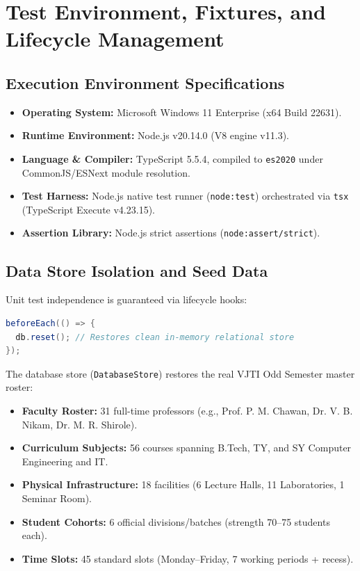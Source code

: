 \documentclass[11pt,a4paper]{article}
\begin{document}
\section{Test Environment, Fixtures, and Lifecycle Management}

\subsection{Execution Environment Specifications}
\begin{itemize}
    \item \textbf{Operating System:} Microsoft Windows 11 Enterprise (x64 Build 22631).
    \item \textbf{Runtime Environment:} Node.js v20.14.0 (V8 engine v11.3).
    \item \textbf{Language \& Compiler:} TypeScript 5.5.4, compiled to \texttt{es2020} under CommonJS/ESNext module resolution.
    \item \textbf{Test Harness:} Node.js native test runner (\texttt{node:test}) orchestrated via \texttt{tsx} (TypeScript Execute v4.23.15).
    \item \textbf{Assertion Library:} Node.js strict assertions (\texttt{node:assert/strict}).
\end{itemize}

\subsection{Data Store Isolation and Seed Data}
Unit test independence is guaranteed via lifecycle hooks:
\begin{lstlisting}[language=Java]
beforeEach(() => {
  db.reset(); // Restores clean in-memory relational store
});
\end{lstlisting}
The database store (\texttt{DatabaseStore}) restores the real VJTI Odd Semester master roster:
\begin{itemize}
    \item \textbf{Faculty Roster:} 31 full-time professors (e.g., Prof. P. M. Chawan, Dr. V. B. Nikam, Dr. M. R. Shirole).
    \item \textbf{Curriculum Subjects:} 56 courses spanning B.Tech, TY, and SY Computer Engineering and IT.
    \item \textbf{Physical Infrastructure:} 18 facilities (6 Lecture Halls, 11 Laboratories, 1 Seminar Room).
    \item \textbf{Student Cohorts:} 6 official divisions/batches (strength 70--75 students each).
    \item \textbf{Time Slots:} 45 standard slots (Monday--Friday, 7 working periods + recess).
\end{itemize}
\end{document}
